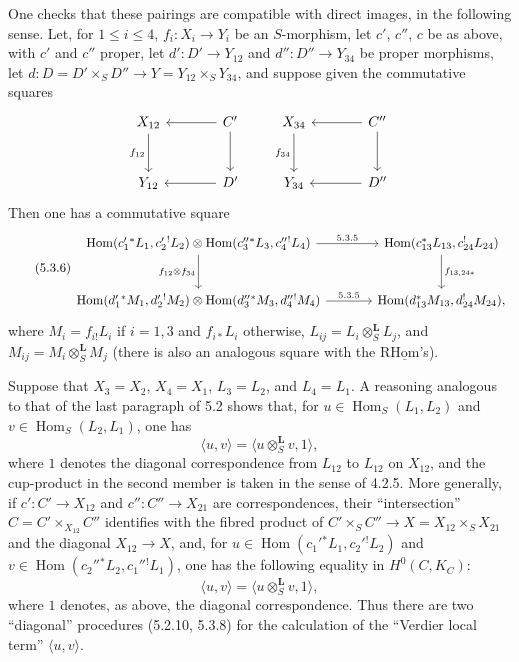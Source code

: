 \documentclass[11pt]{article}
\DeclareMathOperator{\Hom}{Hom}
\providecommand{\Hom}{\operatorname{Hom}}
\providecommand{\Hom}{\operatorname{Hom}}
\begin{document}
One checks that these pairings are compatible with direct images, in the following sense. Let, for $1\leq i\leq4$, $f_i:X_i\to Y_i$ be an $S$-morphism, let $c'$, $c''$, $c$ be as above, with $c'$ and $c''$ proper, let $d':D'\to Y_{12}$ and $d'':D''\to Y_{34}$ be proper morphisms, let $d:D=D'\times_SD''\to Y=Y_{12}\times_SY_{34}$, and suppose given the commutative squares
\[
\begin{tikzcd}[column sep=large,row sep=large]
X_{12} \arrow[d,"f_{12}"'] & C' \arrow[l] \arrow[d] \\
Y_{12} & D' \arrow[l]
\end{tikzcd}
\qquad
\begin{tikzcd}[column sep=large,row sep=large]
X_{34} \arrow[d,"f_{34}"'] & C'' \arrow[l] \arrow[d] \\
Y_{34} & D'' \arrow[l]
\end{tikzcd}
\]
Then one has a commutative square
\begin{equation}
\tag{5.3.6}
\begin{tikzcd}[column sep=large,row sep=large]
\Hom(c_1'{}^*L_1,c_2'{}^!L_2)\otimes\Hom(c_3''{}^*L_3,c_4''{}^!L_4) \arrow[r,"5.3.5"] \arrow[d,"f_{12}\otimes f_{34}"']
& \Hom(c_{13}^*L_{13},c_{24}^!L_{24}) \arrow[d,"f_{13,24*}"] \\
\Hom(d_1'{}^*M_1,d_2'{}^!M_2)\otimes\Hom(d_3''{}^*M_3,d_4''{}^!M_4) \arrow[r,"5.3.5"]
& \Hom(d_{13}^*M_{13},d_{24}^!M_{24}),
\end{tikzcd}
\end{equation}
where $M_i=f_{i!}L_i$ if $i=1,3$ and $f_{i*}L_i$ otherwise, $L_{ij}=L_i\otimes_S^{\mathbf L}L_j$, and $M_{ij}=M_i\otimes_S^{\mathbf L}M_j$ (there is also an analogous square with the $\mathrm{R}\underline{\mathrm{Hom}}$'s).

Suppose that $X_3=X_2$, $X_4=X_1$, $L_3=L_2$, and $L_4=L_1$. A reasoning analogous to that of the last paragraph of 5.2 shows that, for $u\in\Hom_S(L_1,L_2)$ and $v\in\Hom_S(L_2,L_1)$, one has
\begin{equation}
\tag{5.3.7}
\langle u,v\rangle=\langle u\otimes_S^{\mathbf L}v,1\rangle,
\end{equation}
where $1$ denotes the diagonal correspondence from $L_{12}$ to $L_{12}$ on $X_{12}$, and the cup-product in the second member is taken in the sense of 4.2.5. More generally, if $c':C'\to X_{12}$ and $c'':C''\to X_{21}$ are correspondences, their ``intersection'' $C=C'\times_{X_{12}}C''$ identifies with the fibred product of $C'\times_SC''\to X=X_{12}\times_SX_{21}$ and the diagonal $X_{12}\to X$, and, for $u\in\Hom(c_1'{}^*L_1,c_2'{}^!L_2)$ and $v\in\Hom(c_2''{}^*L_2,c_1''{}^!L_1)$, one has the following equality in $H^0(C,K_C)$:
\begin{equation}
\tag{5.3.8}
\langle u,v\rangle=\langle u\otimes_S^{\mathbf L}v,1\rangle,
\end{equation}
where $1$ denotes, as above, the diagonal correspondence. Thus there are two ``diagonal'' procedures (5.2.10, 5.3.8) for the calculation of the ``Verdier local term'' $\langle u,v\rangle$.
\end{document}
